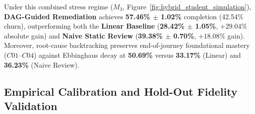 \documentclass[a4paper,12pt]{report}
\begin{document}
Under this combined stress regime ($M_3$, Figure~\ref{fig:hybrid_student_simulation}), \textbf{DAG-Guided Remediation} achieves \textbf{57.46\% $\pm$ 1.02\%} completion (42.54\% churn), outperforming both the \textbf{Linear Baseline} (\textbf{28.42\% $\pm$ 1.05\%}, $+29.04\%$ absolute gain) and \textbf{Naive Static Review} (\textbf{39.38\% $\pm$ 0.70\%}, $+18.08\%$ gain). Moreover, root-cause backtracking preserves end-of-journey foundational mastery ($C01$--$C04$) against Ebbinghaus decay at \textbf{50.69\%} versus \textbf{33.17\%} (Linear) and \textbf{36.23\%} (Naive Review).

\subsection{Empirical Calibration and Hold-Out Fidelity Validation}
\label{sec:empirical_calibration}
\end{document}
